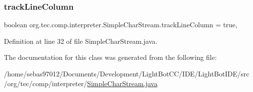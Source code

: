 \subsubsection{\texorpdfstring{track\+Line\+Column}{trackLineColumn}}
{\footnotesize\ttfamily boolean org.\+tec.\+comp.\+interpreter.\+Simple\+Char\+Stream.\+track\+Line\+Column = true\hspace{0.3cm}{\ttfamily [static]}, {\ttfamily [protected]}}



Definition at line 32 of file Simple\+Char\+Stream.\+java.



The documentation for this class was generated from the following file\+:\begin{DoxyCompactItemize}
\item 
/home/sebas97012/\+Documents/\+Development/\+Light\+Bot\+C\+C/\+I\+D\+E/\+Light\+Bot\+I\+D\+E/src/org/tec/comp/interpreter/\mbox{\hyperlink{_simple_char_stream_8java}{Simple\+Char\+Stream.\+java}}\end{DoxyCompactItemize}
